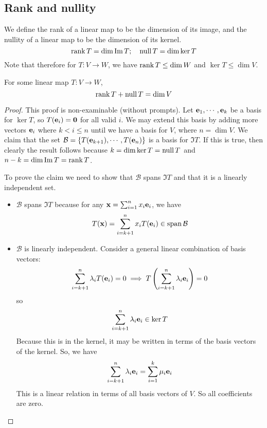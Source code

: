 \subsection{Rank and nullity}
We define the rank of a linear map to be the dimension of its image, and the nullity of a linear map to be the dimension of its kernel.
\[
	\rank T = \dim \operatorname{Im} T; \quad \operatorname{null} T = \dim \ker T
\]
Note that therefore for \(T: V \to W\), we have \(\rank T \leq \dim W\) and \(\ker T \leq \dim V\).
\begin{theorem}
	For some linear map \(T: V \to W\),
	\[
		\rank T + \operatorname{null} T = \dim V
	\]
\end{theorem}
\begin{proof}
	This proof is non-examinable (without prompts).
	Let \(\vb e_1, \cdots, \vb e_k\) be a basis for \(\ker T\), so \(T(\vb e_i) = \vb 0\) for all valid \(i\).
	We may extend this basis by adding more vectors \(\vb e_i\) where \(k < i \leq n\) until we have a basis for \(V\), where \(n=\dim V\).
	We claim that the set \(\mathcal B = \{ T(\vb e_{k+1}), \cdots, T(\vb e_n) \}\) is a basis for \(\Im T\).
	If this is true, then clearly the result follows because \(k = \dim \ker T = \operatorname{null} T\) and \(n-k = \dim \operatorname{Im} T = \rank T\).

	To prove the claim we need to show that \(\mathcal B\) spans \(\Im T\) and that it is a linearly independent set.
	\begin{itemize}
		\item \(\mathcal B\) spans \(\Im T\) because for any \(\vb x = \sum_{i=1}^n x_i \vb e_i\), we have
		      \[
			      T(\vb x) = \sum_{i=k+1}^n x_i T(\vb e_i) \in \operatorname{span} \mathcal B
		      \]
		\item \(\mathcal B\) is linearly independent.
		      Consider a general linear combination of basis vectors:
		      \[
			      \sum_{i=k+1}^n \lambda_i T(\vb e_i) = 0 \implies T\left( \sum_{i=k+1}^n \lambda_i \vb e_i \right) = 0
		      \]
		      so
		      \[
			      \sum_{i=k+1}^n \lambda_i \vb e_i \in \ker T
		      \]
		      Because this is in the kernel, it may be written in terms of the basis vectors of the kernel.
		      So, we have
		      \[
			      \sum_{i=k+1}^n \lambda_i \vb e_i = \sum_{i=1}^k \mu_i \vb e_i
		      \]
		      This is a linear relation in terms of all basis vectors of \(V\).
		      So all coefficients are zero.
	\end{itemize}
\end{proof}

